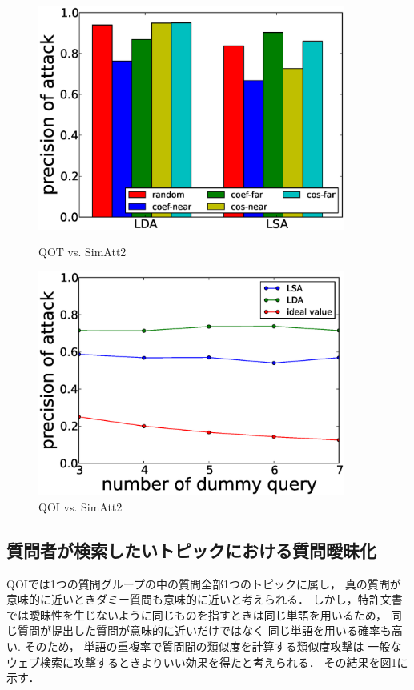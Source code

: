 \documentclass[master]{suribt}
\theoremstyle{definition}
\begin{document}
 \begin{figure}
 \begin{minipage}[t]{0.5\linewidth}
 \centering
 \includegraphics[width=0.9\textwidth]{AAAA2-2.eps}
 \vspace{5em}
 \caption{QOT vs. SimAtt2}
 \label{fig:s2:AAAA}
 \end{minipage}%
 \begin{minipage}[t]{0.5\linewidth}
 \centering
 \includegraphics[width=0.9\textwidth]{BBBB2.eps}
 \vspace{5em}
 \caption{QOI vs. SimAtt2}
 \label{fig:s2:BBBB}
 \end{minipage}
 \end{figure}

 \subsection{質問者が検索したいトピックにおける質問曖昧化} 
 QOIでは1つの質問グループの中の質問全部1つのトピックに属し，
 真の質問が意味的に近いときダミー質問も意味的に近いと考えられる．
 しかし，特許文書では曖昧性を生じないように同じものを指すときは同じ単語を用いるため，
 同じ質問が提出した質問が意味的に近いだけではなく
 同じ単語を用いる確率も高い.
 そのため，
 単語の重複率で質問間の類似度を計算する類似度攻撃は
 一般なウェブ検索に攻撃するときよりいい効果を得たと考えられる．
 その結果を図\ref{fig:s2:BBBB}に示す．
 
\end{document}
